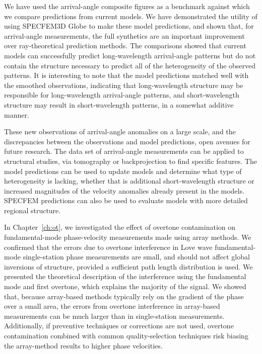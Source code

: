 \documentclass[12pt,oneside]{book}
\begin{document}
We have used the arrival-angle composite figures as a benchmark against which we compare predictions from current models. We have demonstrated the utility of using SPECFEM3D Globe to make these model predictions, and shown that, for arrival-angle measurements, the full synthetics are an important improvement over ray-theoretical prediction methods. The comparisons showed that current models can successfully predict long-wavelength arrival-angle patterns but do not contain the structure necessary to predict all of the heterogeneity of the observed patterns. It is interesting to note that the model predictions matched well with the smoothed observations, indicating that long-wavelength structure may be responsible for long-wavelength arrival-angle patterns, and short-wavelength structure may result in short-wavelength patterns, in a somewhat additive manner.

These new observations of arrival-angle anomalies on a large scale, and the discrepancies between the observations and model predictions, open avenues for future research. The data set of arrival-angle measurements can be applied to structural studies, via tomography or backprojection to find specific features. The model predictions can be used to update models and determine what type of heterogeneity is lacking, whether that is additional short-wavelength structure or increased magnitudes of the velocity anomalies already present in the models. SPECFEM predictions can also be used to evaluate models with more detailed regional structure. 

In Chapter~\ref{ch:ot}, we investigated the effect of overtone contamination on fundamental-mode phase-velocity measurements made using array methods. We confirmed that the errors due to overtone interference in Love wave fundamental-mode single-station phase measurements are small, and should not affect global inversions of structure, provided a sufficient path length distribution is used. We presented the theoretical description of the interference using the fundamental mode and first overtone, which explains the majority of the signal. We showed that, because array-based methods typically rely on the gradient of the phase over a small area, the errors from overtone interference in array-based measurements can be much larger than in single-station measurements. Additionally, if preventive techniques or corrections are not used, overtone contamination combined with common quality-selection techniques risk biasing the array-method results to higher phase velocities. 
\end{document}

